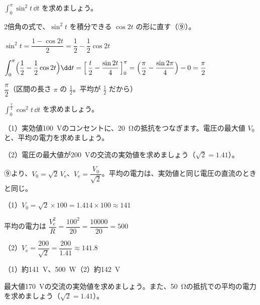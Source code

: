 \begin{reidai}
$\displaystyle\int_0^{\pi}\sin^2t\,\dd t$ を求めましょう。\par
\kangaekata 2倍角の式で、$\sin^2t$ を積分できる $\cos2t$ の形に直す（⑨）。\par
\shiki $\sin^2t=\dfrac{1-\cos2t}{2}=\dfrac{1}{2}-\dfrac{1}{2}\cos2t$\par\vspace{2pt}
\hspace*{2.6\zw}$\displaystyle\int_0^{\pi}\Bigl(\frac{1}{2}-\frac{1}{2}\cos2t\Bigr)\dd t=\Bigl[\,\frac{t}{2}-\frac{\sin2t}{4}\,\Bigr]_0^{\pi}=\Bigl(\frac{\pi}{2}-\frac{\sin2\pi}{4}\Bigr)-0=\frac{\pi}{2}$\par
\kotae $\dfrac{\pi}{2}$（区間の長さ $\pi$ の $\frac{1}{2}$。平均が $\frac{1}{2}$ だから）
\end{reidai}

\begin{jibun}
$\displaystyle\int_0^{\frac{\pi}{2}}\cos^2t\,\dd t$ を求めましょう。
\end{jibun}

\begin{reidai}[交流の実効値と電力]
（1）実効値\qty{100}{V}のコンセントに、\qty{20}{\ohm}の抵抗をつなぎます。電圧の最大値 $V_0$ と、平均の電力を求めましょう。\par
（2）電圧の最大値が\qty{200}{V}の交流の実効値を求めましょう（$\sqrt2=1.41$）。\par
\kangaekata ⑨より、$V_0=\sqrt2\,V_{\mathrm{e}}$、$V_{\mathrm{e}}=\dfrac{V_0}{\sqrt2}$。平均の電力は、実効値と同じ電圧の直流のときと同じ。\par
\shiki（1）$V_0=\sqrt2\times100=1.414\times100\approx141$\par
\hspace*{4.6\zw}平均の電力は $\dfrac{V_{\mathrm{e}}^2}{R}=\dfrac{100^2}{20}=\dfrac{10000}{20}=500$\par
\hspace*{2.6\zw}（2）$V_{\mathrm{e}}=\dfrac{200}{\sqrt2}=\dfrac{200}{1.41}\approx141.8$\par
\kotae （1）約\qty{141}{V}、\qty{500}{W}\quad（2）約\qty{142}{V}
\end{reidai}

\begin{jibun}
最大値\qty{170}{V}の交流の実効値を求めましょう。また、\qty{50}{\ohm}の抵抗での平均の電力を求めましょう（$\sqrt2=1.41$）。
\end{jibun}

